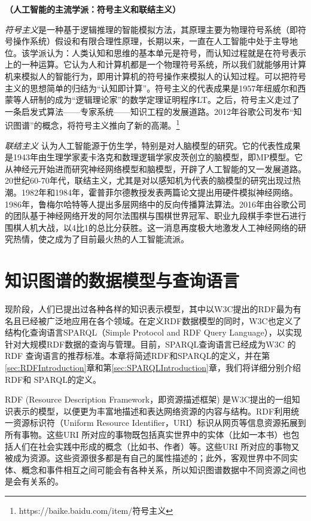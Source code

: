 \begin{example}\textbf{（人工智能的主流学派：符号主义和联结主义）}


\emph{符号主义}是一种基于逻辑推理的智能模拟方法，其原理主要为物理符号系统（即符号操作系统）假设和有限合理性原理，长期以来，一直在人工智能中处于主导地位。该学派认为：人类认知和思维的基本单元是符号，而认知过程就是在符号表示上的一种运算。它认为人和计算机都是一个物理符号系统，所以我们就能够用计算机来模拟人的智能行为，即用计算机的符号操作来模拟人的认知过程。可以把符号主义的思想简单的归结为“认知即计算”。符号主义的代表成果是1957年纽威尔和西蒙等人研制的成为“逻辑理论家”的数学定理证明程序LT。之后，符号主义走过了一条启发式算法——专家系统——知识工程的发展道路。2012年谷歌公司发布“知识图谱”的概念，将符号主义推向了新的高潮。\footnote{https://baike.baidu.com/item/符号主义}


\emph{联结主义}
认为人工智能源于仿生学，特别是对人脑模型的研究。它的代表性成果是1943年由生理学家麦卡洛克和数理逻辑学家皮茨创立的脑模型，即MP模型。它从神经元开始进而研究神经网络模型和脑模型，开辟了人工智能的又一发展道路。20世纪60-70年代，联结主义，尤其是对以感知机为代表的脑模型的研究出现过热潮。1982年和1984年，霍普菲尔德教授发表两篇论文提出用硬件模拟神经网络。1986年，鲁梅尔哈特等人提出多层网络中的反向传播算法算法。2016年由谷歌公司的团队基于神经网络开发的阿尔法围棋与围棋世界冠军、职业九段棋手李世石进行围棋人机大战，以4比1的总比分获胜。这一消息再度极大地激发人工神经网络的研究热情，使之成为了目前最火热的人工智能流派。\cite{book:AI}


\end{example}


\section{知识图谱的数据模型与查询语言}
现阶段，人们已提出过各种各样的知识表示模型，其中以W3C提出的RDF\cite{url:RDF}最为有名且已经被广泛地应用在各个领域。在定义RDF数据模型的同时，W3C也定义了结构化查询语言SPARQL（Simple Protocol and RDF Query Language）\cite{url:sparql}，以实现针对大规模RDF数据的查询与管理。目前，SPARQL查询语言已经成为W3C 的RDF 查询语言的推荐标准。本章将简述RDF和SPARQL的定义，并在第\ref{sec:RDFIntroduction}章和第\ref{sec:SPARQLIntroduction}章，我们将详细分别介绍RDF和 SPARQL的定义。




RDF (Resource Description Framework，即资源描述框架) 是W3C提出的一组知识表示的模型，以便更为丰富地描述和表达网络资源的内容与结构。RDF利用统一资源标识符（Uniform Resource Identifier，URI）标识从网页等信息资源拓展到所有事物。这些URI 所对应的事物既包括真实世界中的实体（比如一本书）也包括人们在社会实践中形成的概念（比如书、作者）等。这些URI 所对应的事物又被成为资源。这些资源很多都是有自己的属性描述的；此外，客观世界中不同实体、概念和事件相互之间可能会有各种关系，所以知识图谱数据中不同资源之间也是会有关系的。


